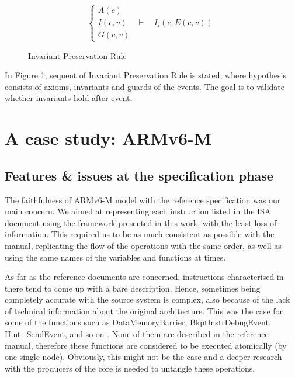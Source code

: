 \documentclass[conference]{IEEEtran}
\begin{document}
\begin{figure}[ht!]
\begin{center}
	$$\begin{cases}
	A(c)\\
	I(c, v) & \vdash \quad I_i(c, E(c,v))\\
	G(c, v)
  \end{cases}$$
	\caption{Invariant Preservation Rule}
	\label{fig:eveB}
\end{center}
\end{figure}

In Figure \ref{fig:eveB}, sequent of Invariant Preservation Rule is stated, where hypothesis consists of axioms, invariants and guards of the events. The goal is to validate whether invariants hold after event.


\section{A case study: ARMv6-M}
\label{sec:arm}

\subsection{Features \& issues at the specification phase}
\label{sec:feat}
The faithfulness of ARMv6-M model with the reference specification was our main concern.
We aimed at representing each instruction listed in the ISA document using the
framework presented in this work, with the least loss of information. This required us to be
as much consistent as possible with the manual, replicating the flow of the operations with
the same order, as well as using the same names of the variables and functions at times.

As far as the reference documents are concerned, instructions characterised in there tend to
come up with a bare description. Hence, sometimes being completely accurate with 
the source system is complex, also because of the lack of technical information about the
original architecture. This was the case for some of the functions such as DataMemoryBarrier,
BkptInstrDebugEvent, Hint\_SendEvent, and so on \cite{armManual}.
None of them are described in the reference manual, therefore these
functions are considered to be executed atomically (by one single node). Obviously, this
might not be the case and a deeper research with the producers of the core is needed to
untangle these operations.
\end{document}
